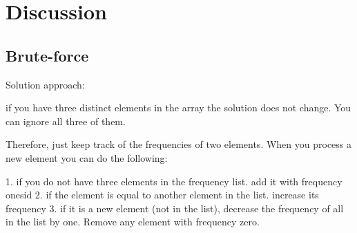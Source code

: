 \begin{QandA}
	\item 
	\begin{answered}
		\textit{}
	\end{answered}
	
\end{QandA}

\section{Discussion}
\label{find_repeated_number_n_divided_3_times:sec:discussion}


\subsection{Brute-force}
\label{find_repeated_number_n_divided_3_times:sec:bruteforce}
Solution approach:

if you have three distinct elements in the array the solution does not change. You can ignore all three of them.

Therefore, just keep track of the frequencies of two elements.
When you process a new element you can do the following:

1. if you do not have three elements in the frequency list. add it with frequency onesid
2. if the element is equal to another element in the list. increase its frequency
3. if it is a new element (not in the list), decrease the frequency of all in the list by one. Remove any element with frequency zero.
\begin{minipage}{\linewidth}
	
\end{minipage}

